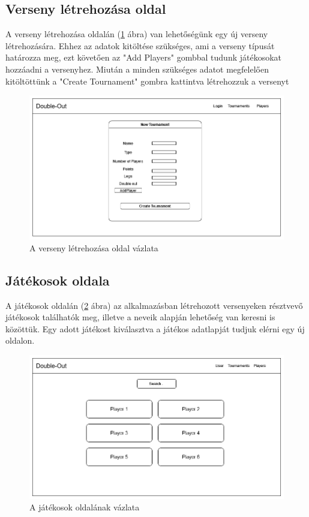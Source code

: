 \subsection{Verseny létrehozása oldal}
A verseny létrehozása oldalán (\ref{fig:newTournament} ábra) van lehetőségünk egy új verseny létrehozására. Ehhez az adatok kitöltése szükséges, ami a verseny típusát határozza meg, ezt követően az "Add Players" gombbal tudunk játékosokat hozzáadni a versenyhez. Miután a minden szükséges adatot megfelelően kitöltöttünk a "Create Tournament" gombra kattintva létrehozzuk a versenyt

\begin{figure}[h]
\centering
\includegraphics[scale=0.4]{images/NewTournament.png}
\caption{A verseny létrehozása oldal vázlata}
\label{fig:newTournament}
\end{figure}

\subsection{Játékosok oldala}
A játékosok oldalán (\ref{fig:players} ábra) az alkalmazásban létrehozott versenyeken résztvevő játékosok találhatók meg, illetve a neveik alapján lehetőség van keresni is közöttük. Egy adott játékost kiválasztva a játékos adatlapját tudjuk elérni egy új oldalon.

\begin{figure}[h]
\centering
\includegraphics[scale=0.4]{images/PlayersPage.png}
\caption{A játékosok oldalának vázlata}
\label{fig:players}
\end{figure}

